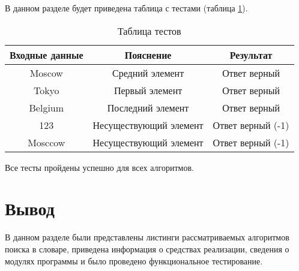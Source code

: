 В данном разделе будет приведена таблица с тестами (таблица \ref{table:ref1}).
\begin{center}
	\captionsetup{justification=raggedleft,singlelinecheck=off}
\begin{table}[ht]
	\centering
	\caption{Таблица тестов}
	\label{table:ref1}
	\begin{tabular}{ |c|c|c|}
		\hline
		Входные данные    & Пояснение   	  & Результат    \\ \hline
		\hline
		Moscow			  & Средний элемент   & Ответ верный \\ \hline
		Tokyo 			  & Первый элемент    & Ответ верный \\ \hline
		Belgium 		  & Последний элемент & Ответ верный \\ \hline
		123 & Несуществующий элемент & Ответ верный (-1) \\ \hline
		Mosccow & Несуществующий элемент & Ответ верный (-1) \\ \hline
	\end{tabular}
\end{table}
\end{center}
Все тесты пройдены успешно для всех алгоритмов.


\section{Вывод}
В данном разделе были представлены листинги рассматриваемых алгоритмов поиска в словаре, приведена информация о средствах реализации, сведения о модулях программы и было проведено функциональное тестирование.